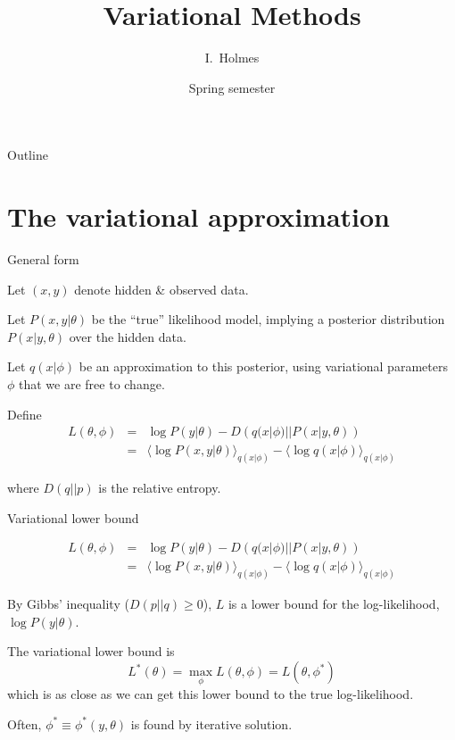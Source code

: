 \documentclass{beamer}
\title[Variational] %
{Variational Methods}
\author%
{I.~Holmes} %
\institute[University of California, Berkeley] %
{
  Department of Bioengineering\\
  University of California, Berkeley}
\date%
{Spring semester}
\begin{document}
\begin{frame}
  \titlepage
\end{frame}

\begin{frame}{Outline}
  \tableofcontents
\end{frame}

\section{The variational approximation}

\begin{frame}{General form}

Let $(x,y)$ denote hidden \& observed data.

Let $P(x,y|\theta)$ be the ``true'' likelihood model,
implying a posterior distribution $P(x|y,\theta)$ over the hidden data.

Let $q(x|\phi)$ be an approximation to this posterior,
using variational parameters $\phi$
that we are free to change.

Define
\begin{eqnarray*}
L(\theta,\phi) & = & \log P(y|\theta) - D\left(q(x|\phi)||P(x|y,\theta)\right) \\
& = & \langle \log P(x,y|\theta) \rangle_{q(x|\phi)} - \langle \log q(x|\phi) \rangle_{q(x|\phi)}
\end{eqnarray*}

where $D(q||p)$ is the relative entropy.

\end{frame}


\begin{frame}{Variational lower bound}

\begin{eqnarray*}
L(\theta,\phi) & = & \log P(y|\theta) - D\left(q(x|\phi)||P(x|y,\theta)\right) \\
& = & \langle \log P(x,y|\theta) \rangle_{q(x|\phi)} - \langle \log q(x|\phi) \rangle_{q(x|\phi)}
\end{eqnarray*}

By Gibbs' inequality ($D(p||q) \geq 0$), $L$ is a lower bound for the log-likelihood, $\log P(y|\theta)$.

The variational lower bound is
\[
L^\ast(\theta) = \max_{\phi} L(\theta,\phi) = L(\theta,\phi^\ast)
\]
which is as close as we can get this lower bound to the true log-likelihood.

Often, $\phi^\ast \equiv \phi^\ast(y,\theta)$ is found by iterative solution.

\end{frame}
\end{document}
